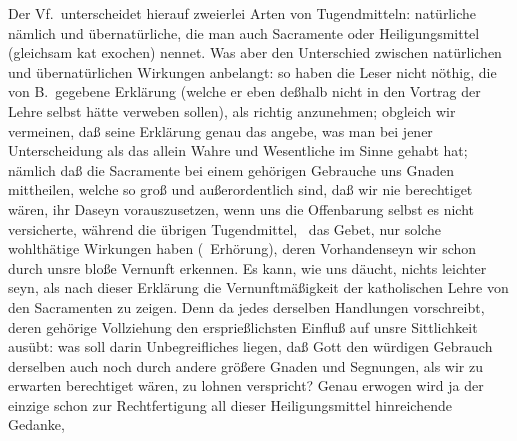 Der Vf.\ unterscheidet hierauf zweierlei Arten von Tugendmitteln: natürliche nämlich und übernatürliche, die man auch Sacramente oder Heiligungsmittel (gleichsam kat exochen) nennet. Was aber den Unterschied zwischen natürlichen und übernatürlichen Wirkungen anbelangt: so haben die Leser nicht nöthig, die von B.\ gegebene Erklärung (welche er eben deßhalb nicht in den Vortrag der Lehre selbst hätte verweben sollen), als richtig anzunehmen; obgleich wir vermeinen, daß seine Erklärung genau das angebe, was man bei jener Unterscheidung als das allein Wahre und Wesentliche im Sinne gehabt hat; nämlich daß die Sacramente bei einem gehörigen Gebrauche uns Gnaden mittheilen, welche so groß und außerordentlich sind, daß wir nie berechtiget wären, ihr Daseyn vorauszusetzen, wenn uns die Offenbarung selbst es nicht versicherte, während die übrigen Tugendmittel, \zB\ das Gebet, nur solche wohlthätige Wirkungen haben (\zB\ Erhörung), deren Vorhandenseyn wir schon durch unsre bloße Vernunft erkennen. Es kann, wie uns däucht, nichts leichter seyn, als nach dieser Erklärung die Vernunftmäßigkeit der katholischen Lehre von den Sacramenten zu zeigen. Denn da jedes derselben Handlungen vorschreibt, deren gehörige Vollziehung den ersprießlichsten Einfluß auf unsre Sittlichkeit ausübt: was soll darin Unbegreifliches liegen, daß Gott den würdigen Gebrauch derselben auch noch durch andere größere Gnaden und Segnungen, als wir zu erwarten berechtiget wären, zu lohnen verspricht? Genau erwogen wird ja der einzige schon zur Rechtfertigung all dieser Heiligungsmittel hinreichende Gedanke,   \par
